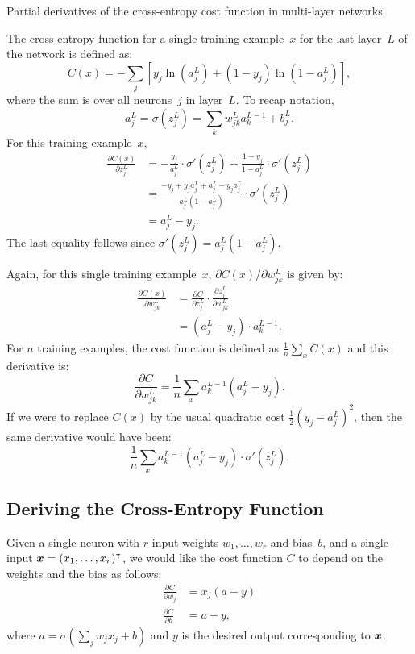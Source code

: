 \begin{exercise}
Partial derivatives of the cross-entropy cost function in multi-layer
networks.
\end{exercise}
\begin{solution}
The cross-entropy function for a single training example~$x$ for the last
layer~$L$ of the network is defined as:
\[
    C(x) = - \sum_j \left [ y_j \ln (a_j^L) + (1 - y_j) \ln(1 - a_j^L) \right ],
\]
where the sum is over all neurons~$j$ in layer~$L$. To recap notation,  
\[
a_j^L = \sigma(z_j^L) = \sum_k w_{j k}^L a_k^{L - 1} + b_j^L.
\]
For this training example~$x$,
\begin{align*}
    \frac{\partial C(x)}{\partial z_j^L} 
        & = - \frac{y_j}{a_j^L} \cdot \sigma' (z_j^L) + \frac{1 - y_j}{1 - a_j^L} \cdot \sigma' (z_j^L) \\
        & = \frac{-y_j + y_j a_j^L + a_j^L - y_j a_j^L}{a_j^L (1 - a_j^L)} \cdot \sigma' (z_j^L) \\
        & = a_j^L - y_j.
\end{align*}
The last equality follows since $\sigma' (z_j^L) = a_j^L (1 - a_j^L)$.

Again, for this single training example~$x$, $\partial C (x) / \partial w_{j k}^L$ 
is given by:
\begin{align*}
    \frac{\partial C (x)}{\partial w_{j k}^L} 
        & = \frac{\partial C}{\partial z_j^L} \cdot \frac{\partial z_j^L}{\partial w_{j k}^L} \\
        & = (a_j^L - y_j) \cdot a_k^{L - 1}. 
\end{align*}
For $n$ training examples, the cost function is defined as $\frac{1}{n} \sum_{x} C(x)$ and 
this derivative is: 
\[
    \frac{\partial C}{\partial w_{j k}^L} = \frac{1}{n} \sum_x a_k^{L - 1} (a_j^L - y_j).
\]
If we were to replace $C(x)$ by the usual quadratic cost $\frac{1}{2}(y_j - a_j^L)^2$, then 
the same derivative would have been:
\[
    \frac{1}{n} \sum_x a_k^{L - 1} (a_j^L - y_j) \cdot \sigma' (z_j^L).
\]
\end{solution}

\subsection{Deriving the Cross-Entropy Function}

Given a single neuron with $r$ input weights $w_1, \ldots, w_r$ and bias~$b$,
and a single input $\boldsymbol{x} = (x_1, \ldots, x_r)^{\intercal}$, we would like the
cost function $C$ to depend on the weights and the bias as follows:
\begin{align}
    \frac{\partial C}{\partial w_j} & = x_j (a - y) \\
    \frac{\partial C}{\partial b}   & = a - y, \label{eqn:cost_bias}
\end{align}
where $a = \sigma(\sum_{j} w_j x_j + b)$ and $y$ is the desired output 
corresponding to $\boldsymbol{x}$. 

